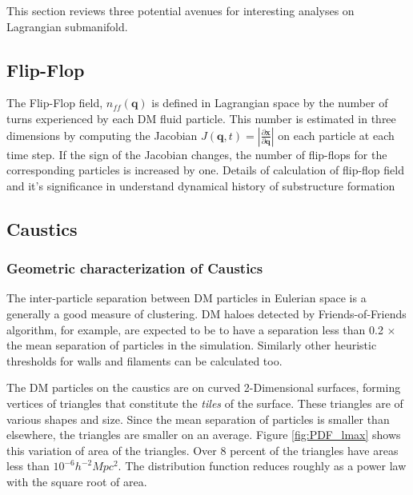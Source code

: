 This section reviews three potential avenues for interesting analyses on Lagrangian submanifold. 

\subsection{Flip-Flop}

The Flip-Flop field, $n_{ff}(\mathbf{q})$ is defined in Lagrangian space by the number of turns experienced by each DM fluid particle. This number is estimated in three dimensions by computing the Jacobian  $J(\mathbf{q}, t) = |\frac{\partial\mathbf{x}}{\partial\mathbf{q}}|$  on each particle at each time step. If the sign of the Jacobian changes, the number of flip-flops for the corresponding particles is increased by one. Details of calculation of flip-flop field and it's significance in understand dynamical history of substructure formation 


\subsection{Caustics}



\subsubsection{Geometric characterization of Caustics}

The inter-particle separation between DM particles in Eulerian space is a generally a good measure of clustering. DM haloes detected by Friends-of-Friends algorithm, for example, are expected to be to have a separation less than 0.2 $\times$ the mean separation of particles in the simulation. Similarly other heuristic thresholds for walls and filaments can be calculated too. 

The DM particles on the caustics are on curved 2-Dimensional surfaces, forming vertices of triangles that constitute the {\it tiles} of the surface. These triangles are of various shapes and size. Since the mean separation of particles is smaller than elsewhere, the triangles are smaller on an average. Figure \ref{fig:PDF_lmax} shows this variation of area of the triangles. Over 8 percent of the triangles have areas less than $10^{-6} h^{-2}Mpc^2$. The distribution function reduces roughly as a power law with the square root of area. 

